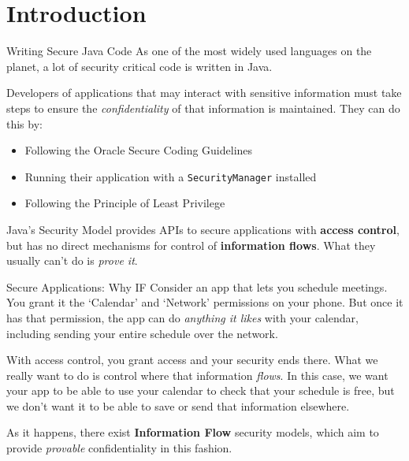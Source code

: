\section{Introduction}

\begin{frame}{Writing Secure Java Code}
	As one of the most widely used languages on the planet, a lot of security critical code is written in Java.
	
	Developers of applications that may interact with sensitive information must take steps to ensure the \textit{confidentiality} of that information is maintained. They can do this by:
	
	\begin{itemize}
		\item Following the Oracle Secure Coding Guidelines
		\item Running their application with a \texttt{SecurityManager} installed
		\item Following the Principle of Least Privilege
	\end{itemize}
	
	Java's Security Model provides APIs to secure applications with \textbf{access control}, but has no direct mechanisms for control of \textbf{information flows}.
	What they usually can't do is \textit{prove it}.
\end{frame}

\begin{frame}{Secure Applications: Why IF}
	Consider an app that lets you schedule meetings. You grant it the `Calendar' and `Network' permissions on your phone. But once it has that permission, the app can do \textit{anything it likes} with your calendar, including sending your entire schedule over the network.
	
	With access control, you grant access and your security ends there. What we really want to do is control where that information \textit{flows}. In this case, we want your app to be able to use your calendar to check that your schedule is free, but we don't want it to be able to save or send that information elsewhere.
	
	As it happens, there exist \textbf{Information Flow} security models, which aim to provide \textit{provable} confidentiality in this fashion.
\end{frame}



